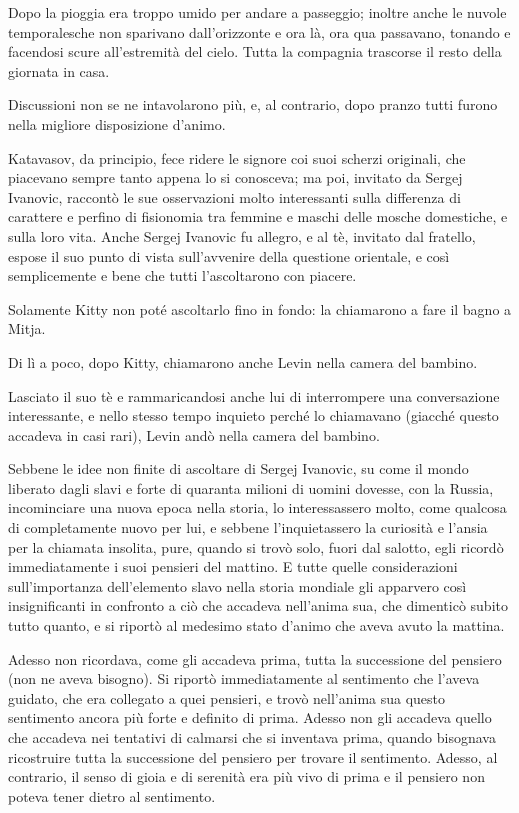 Dopo la pioggia era troppo umido per andare a passeggio; inoltre anche le nuvole temporalesche non sparivano dall'orizzonte e ora là, ora qua passavano, tonando e facendosi scure all'estremità del cielo. Tutta la compagnia trascorse il resto della giornata in casa. 

Discussioni non se ne intavolarono più, e, al contrario, dopo pranzo tutti furono nella migliore disposizione d'animo. 

Katavasov, da principio, fece ridere le signore coi suoi scherzi originali, che piacevano sempre tanto appena lo si conosceva; ma poi, invitato da Sergej Ivanovic, raccontò le sue osservazioni molto interessanti sulla differenza di carattere e perfino di fisionomia tra femmine e maschi delle mosche domestiche, e sulla loro vita. Anche Sergej Ivanovic fu allegro, e al tè, invitato dal fratello, espose il suo punto di vista sull'avvenire della questione orientale, e così semplicemente e bene che tutti l'ascoltarono con piacere. 

Solamente Kitty non poté ascoltarlo fino in fondo: la chiamarono a fare il bagno a Mitja. 

Di lì a poco, dopo Kitty, chiamarono anche Levin nella camera del bambino. 

Lasciato il suo tè e rammaricandosi anche lui di interrompere una conversazione interessante, e nello stesso tempo inquieto perché lo chiamavano (giacché questo accadeva in casi rari), Levin andò nella camera del bambino. 

Sebbene le idee non finite di ascoltare di Sergej Ivanovic, su come il mondo liberato dagli slavi e forte di quaranta milioni di uomini dovesse, con la Russia, incominciare una nuova epoca nella storia, lo interessassero molto, come qualcosa di completamente nuovo per lui, e sebbene l'inquietassero la curiosità e l'ansia per la chiamata insolita, pure, quando si trovò solo, fuori dal salotto, egli ricordò immediatamente i suoi pensieri del mattino. E tutte quelle considerazioni sull'importanza dell'elemento slavo nella storia mondiale gli apparvero così insignificanti in confronto a ciò che accadeva nell'anima sua, che dimenticò subito tutto quanto, e si riportò al medesimo stato d'animo che aveva avuto la mattina. 

Adesso non ricordava, come gli accadeva prima, tutta la successione del pensiero (non ne aveva bisogno). Si riportò immediatamente al sentimento che l'aveva guidato, che era collegato a quei pensieri, e trovò nell'anima sua questo sentimento ancora più forte e definito di prima. Adesso non gli accadeva quello che accadeva nei tentativi di calmarsi che si inventava prima, quando bisognava ricostruire tutta la successione del pensiero per trovare il sentimento. Adesso, al contrario, il senso di gioia e di serenità era più vivo di prima e il pensiero non poteva tener dietro al sentimento. 

